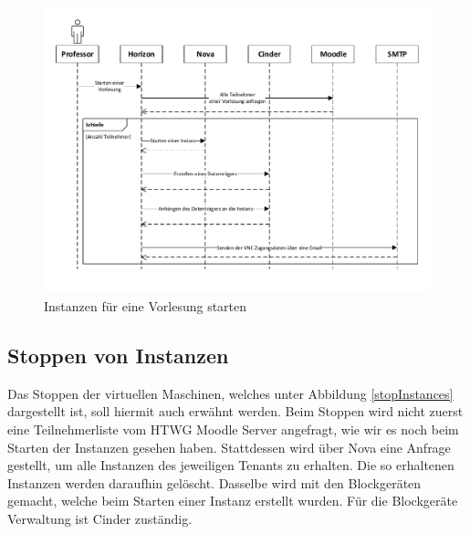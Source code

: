 \begin{figure}[H]
	\centering
	\includegraphics[scale=0.6]{img/startInstances.pdf}
\caption{Instanzen für eine Vorlesung starten}
\label{startInstances}
\FloatBarrier
\end{figure}

\subsection{Stoppen von Instanzen}
Das Stoppen der virtuellen Maschinen, welches unter Abbildung \ref{stopInstances} dargestellt ist,
soll hiermit auch erwähnt werden.
Beim Stoppen wird nicht zuerst eine Teilnehmerliste vom HTWG Moodle Server angefragt, wie
wir es noch beim Starten der Instanzen gesehen haben. Stattdessen wird über Nova eine Anfrage
gestellt, um alle Instanzen des jeweiligen Tenants zu erhalten. Die so erhaltenen Instanzen werden
daraufhin gelöscht. Dasselbe wird mit den Blockgeräten gemacht, welche beim Starten einer
Instanz erstellt wurden. Für die Blockgeräte Verwaltung ist Cinder zuständig.

